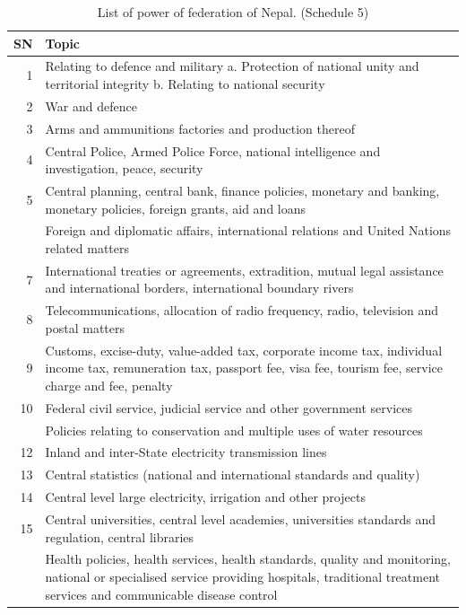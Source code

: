 \documentclass[
  openany]{book}
\begin{document}
\begin{longtable}[t]{r>{\raggedright\arraybackslash}p{35em}}
\caption{\label{tab:power-division-federation}List of power of federation of Nepal. (Schedule 5)}\\
\toprule
SN & Topic\\
\midrule
1 & Relating to defence and military a. Protection of national unity and territorial integrity b. Relating to national security\\
2 & War and defence\\
3 & Arms and ammunitions factories and production thereof\\
4 & Central Police, Armed Police Force, national intelligence and investigation, peace, security\\
5 & Central planning, central bank, finance policies, monetary and banking, monetary policies, foreign grants, aid and loans\\
\addlinespace
6 & Foreign and diplomatic affairs, international relations and United Nations related matters\\
7 & International treaties or agreements, extradition, mutual legal assistance and international borders, international boundary rivers\\
8 & Telecommunications, allocation of radio frequency, radio, television and postal matters\\
9 & Customs, excise-duty, value-added tax, corporate income tax, individual income tax, remuneration tax, passport fee, visa fee, tourism fee, service charge and fee, penalty\\
10 & Federal civil service, judicial service and other government services\\
\addlinespace
11 & Policies relating to conservation and multiple uses of water resources\\
12 & Inland and inter-State electricity transmission lines\\
13 & Central statistics (national and international standards and quality)\\
14 & Central level large electricity, irrigation and other projects\\
15 & Central universities, central level academies, universities standards and regulation, central libraries\\
\addlinespace
16 & Health policies, health services, health standards, quality and monitoring, national or specialised service providing hospitals, traditional treatment services and communicable disease control\\

\end{longtable}
\end{document}
